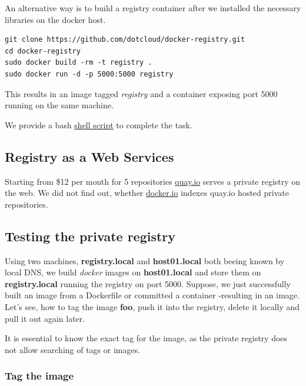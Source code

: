 \documentclass[captions=tableheading]{article}
\begin{document}
An alternative way is to build a registry container after we installed the necessary libraries on the docker host.

\begin{verbatim}
git clone https://github.com/dotcloud/docker-registry.git
cd docker-registry
sudo docker build -rm -t registry .
sudo docker run -d -p 5000:5000 registry
\end{verbatim}
This results in an image tagged \emph{registry} and a container exposing port 5000 running on the same machine.

We provide a bash \href{file://.registry/buildRegistry.sh}{shell script} to complete the task.
\subsection{Registry as a Web Services}
\label{sec-3-6}

Starting from \$12 per month for 5 repositories \href{https://quay.io/}{quay.io} serves a private registry on the web. We did not find out, whether \href{https://index.docker.io/}{docker.io} indexes quay.io hosted private repositories.
\subsection{Testing the private registry}
\label{sec-3-7}

Using two machines, \textbf{registry.local} and \textbf{host01.local} both beeing known by local DNS, we build \emph{docker} images on \textbf{host01.local} and store them on \textbf{registry.local} running the registry on port 5000.  Suppose, we just successfully built an image from a Dockerfile or committed a container -resulting in an image. Let's see, how to tag the image \textbf{foo}, push it into the registry, delete it locally and pull it out again later. 

It is essential to know the exact tag for the image, as the private registry does not allow searching of tags or images. 
\subsubsection{Tag the image}
\label{sec-3-7-1}
\end{document}
